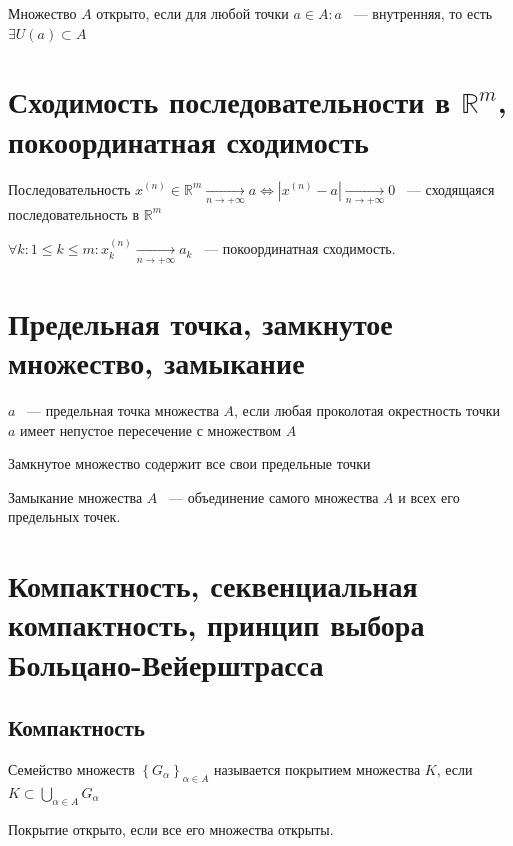 \documentclass{article}
\begin{document}
        Множество $A$ открыто, если для любой точки $a \in A : a$ ~--- внутренняя, то есть $\exists U(a) \subset A$
        
    \newpage
    
    \section{Сходимость последовательности в $\mathbb{R}^m$, покоординатная сходимость}
    
        Последовательность $x^{(n)} \in \mathbb{R}^m \xrightarrow[n \rightarrow +\infty]{} a \Longleftrightarrow | x^{(n)} - a | \xrightarrow[n \rightarrow +\infty]{} 0$ ~--- сходящаяся последовательность в $\mathbb{R}^m$
        
        $\forall k : 1 \leq k \leq m : x^{(n)}_k \xrightarrow[n \rightarrow +\infty]{} a_k$ ~--- покоординатная сходимость.
        
    \newpage
    
    \section{Предельная точка, замкнутое множество, замыкание}
    
        $a$ ~--- предельная точка множества $A$, если любая проколотая окрестность точки $a$ имеет непустое пересечение с множеством $A$
        
        Замкнутое множество содержит все свои предельные точки
        
        Замыкание множества $A$ ~--- объединение самого множества $A$ и всех его предельных точек.
        
    \newpage
    
    \section{Компактность, секвенциальная компактность, принцип выбора Больцано-Вейерштрасса}
    
        \subsection{Компактность}
            
            Семейство множеств $\left\{ G_{\alpha} \right\}_{\alpha \in A}$ называется покрытием множества $K$, если $K \subset \bigcup\limits_{\alpha \in A} G_{\alpha}$
        
            Покрытие открыто, если все его множества открыты.
        
\end{document}
